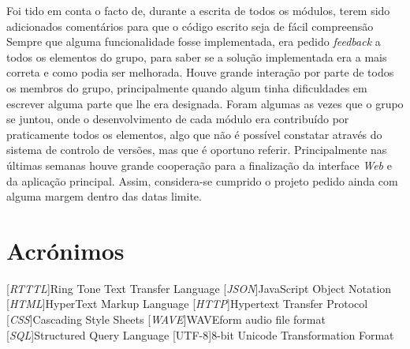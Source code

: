 \documentclass[11pt,openany,twoside]{report}
\begin{document}
Foi tido em conta o facto de, durante a escrita de todos os módulos, terem sido adicionados comentários para que o código escrito seja de fácil compreensão Sempre que alguma funcionalidade fosse implementada, era pedido \textit{feedback} a todos os elementos do grupo, para saber se a solução implementada era a mais correta e como podia ser melhorada. Houve grande interação por parte de todos os membros do grupo, principalmente quando algum tinha dificuldades em escrever alguma parte que lhe era designada. Foram algumas as vezes que o grupo se juntou, onde o desenvolvimento de cada módulo era contribuído por praticamente todos os elementos, algo que não é possível constatar através do sistema de controlo de versões, mas que é oportuno referir. Principalmente nas últimas semanas houve grande cooperação para a finalização da interface \textit{Web} e da aplicação principal. Assim, considera-se cumprido o projeto pedido ainda com alguma margem dentro das datas limite.


\chapter*{Acrónimos}
\begin{acronym}
[\textit{RTTTL}]{Ring Tone Text Transfer Language}
[\textit{JSON}]{JavaScript Object Notation}
[\textit{HTML}]{HyperText Markup Language}
[\textit{HTTP}]{Hypertext Transfer Protocol}
[\textit{CSS}]{Cascading Style Sheets}
[\textit{WAVE}]{WAVEform audio file format}
[\textit{SQL}]{Structured Query Language}
[UTF-8]{8-bit Unicode Transformation Format}
\end{acronym}
\end{document}
